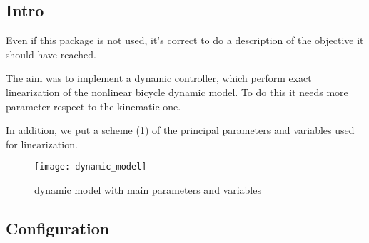 \subsection{Intro}

Even if this package is not used, it's correct to do a description of the objective it should have reached.

The aim was to implement a dynamic controller, which perform exact linearization of the nonlinear bicycle dynamic model. To do this it needs more parameter respect to the kinematic one.

In addition, we put a scheme (\ref{fig:dynamic_model}) of the principal parameters and variables  used for linearization.

\begin{figure}[h]
	\texttt{[image: dynamic\_model]}
	\caption{dynamic model with main parameters and variables}
	\label{fig:dynamic_model}
\end{figure}

\subsection{Configuration}


